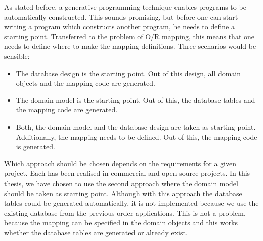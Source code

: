 		As stated before, a generative programming technique enables programs to be automatically
		constructed. This sounds promising, but before one can start writing a program
		which constructs another program, he needs to define a starting point. Transferred
		to the problem of O/R mapping, this means that one needs to define where to make
		the mapping definitions. Three scenarios would be sensible:
		\begin{itemize}
			\item The database design is the starting point. Out of this design, all domain objects
						and the mapping code are generated.
			\item The domain model is the starting point. Out of this, the database tables and the mapping
						code are generated.
			\item Both, the domain model and the database design are taken as starting point. Additionally, the mapping 
						needs to be defined. Out of this, the mapping code is generated.
		\end{itemize} 
		
		Which approach should be chosen depends on the requirements for a given project. Each
		has been realised in commercial and open source projects. In this thesis,
		we have chosen to use the second approach where the domain model should be taken as starting point.
		Although with this approach the database tables could be generated automatically, it is not
		implemented because we use the existing database from the previous order applications. This is
		not a problem, because the mapping can be specified in the domain objects and this works
		whether the database tables are generated or already exist. 
				
	